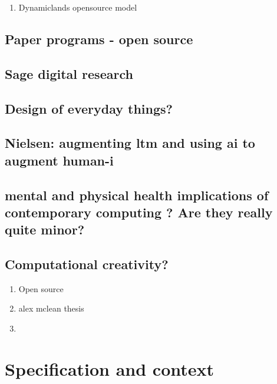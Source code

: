 \documentclass[12pt]{report}
\begin{document}
\begin{enumerate}
\item Dynamiclands opensource model
\label{sec:orga1b94f2}
\end{enumerate}


\section{Paper programs - open source}
\label{sec:orge34c9bc}

\section{Sage digital research}
\label{sec:org4488537}

\section{Design of everyday things?}
\label{sec:orge176ef2}

\section{Nielsen: augmenting ltm and using ai to augment human-i}
\label{sec:org1dea1c8}

\section{mental and physical health implications of contemporary computing ? Are they really quite minor?}
\label{sec:orgefe4cfe}

\section{Computational creativity?}
\label{sec:org360622a}

\begin{enumerate}
\item Open source
\label{sec:org2d1dae3}

\item alex mclean thesis
\label{sec:org8010e45}

\item 
\label{sec:org0ae3e29}
\end{enumerate}

\chapter{Specification and context}
\label{sec:orgedefed5}
\end{document}
